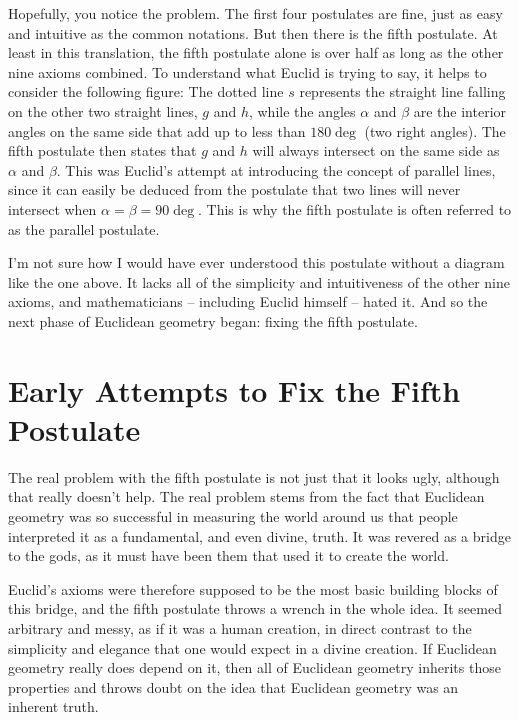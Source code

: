 \documentclass[12pt]{article}
\begin{document}
Hopefully, you notice the problem. The first four postulates are fine, just as easy and intuitive as the common notations. But then there is the fifth postulate. At least in this translation, the fifth postulate alone is over half as long as the other nine axioms combined. To understand what Euclid is trying to say, it helps to consider the following figure:
\fifthpostulate
The dotted line $s$ represents the straight line falling on the other two straight lines, $g$ and $h$, while the angles $\alpha$ and $\beta$ are the interior angles on the same side that add up to less than $180\deg$ (two right angles). The fifth postulate then states that $g$ and $h$ will always intersect on the same side as $\alpha$ and $\beta$. This was Euclid's attempt at introducing the concept of parallel lines, since it can easily be deduced from the postulate that two lines will never intersect when $\alpha=\beta=90\deg$. This is why the fifth postulate is often referred to as the parallel postulate.

I'm not sure how I would have ever understood this postulate without a diagram like the one above. It lacks all of the simplicity and intuitiveness of the other nine axioms, and mathematicians -- including Euclid himself -- hated it. And so the next phase of Euclidean geometry began: fixing the fifth postulate.

\section*{Early Attempts to Fix the Fifth Postulate}

The real problem with the fifth postulate is not just that it looks ugly, although that really doesn't help. The real problem stems from the fact that Euclidean geometry was so successful in measuring the world around us that  people interpreted it as a fundamental, and even divine, truth. It was revered as a bridge to the gods, as it must have been them that used it to create the world.

Euclid's axioms were therefore supposed to be the most basic building blocks of this bridge, and the fifth postulate throws a wrench in the whole idea. It seemed arbitrary and messy, as if it was a human creation, in direct contrast to the simplicity and elegance that one would expect in a divine creation. If Euclidean geometry really does depend on it, then all of Euclidean geometry inherits those properties and throws doubt on the idea that Euclidean geometry was an inherent truth.
\end{document}
